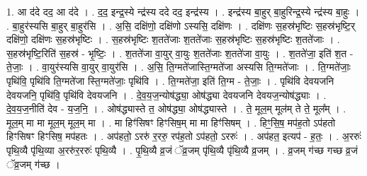 \documentclass[17pt]{extarticle}
\begin{document}
1. आ द॑दे दद॒ आ द॑दे । . द॒द॒ इन्द्र॒स्ये न्द्र॑स्य ददे दद॒ इन्द्र॑स्य । . इन्द्र॑स्य बा॒हुर् बा॒हुरिन्द्र॒स्ये न्द्र॑स्य बा॒हुः । . बा॒हुर॑स्यसि बा॒हुर् बा॒हुर॑सि । . अ॒सि॒ दक्षि॑णो॒ दक्षि॑णो ऽस्यसि॒ दक्षि॑णः । . दक्षि॑णः स॒हस्र॑भृष्टिः स॒हस्र॑भृष्टि॒र् दक्षि॑णो॒ दक्षि॑णः स॒हस्र॑भृष्टिः । . स॒हस्र॑भृष्टिः श॒तते॑जाः श॒तते॑जाः स॒हस्र॑भृष्टिः स॒हस्र॑भृष्टिः श॒तते॑जाः । . स॒हस्र॑भृष्टि॒रिति॑ स॒हस्र॑ - भृ॒ष्टिः॒ । . श॒तते॑जा वा॒युर् वा॒युः श॒तते॑जाः श॒तते॑जा वा॒युः । . श॒तते॑जा॒ इति॑ श॒त - ते॒जाः॒ । . वा॒युर॑स्यसि वा॒युर् वा॒युर॑सि । . अ॒सि॒ ति॒ग्मते॑जास्ति॒ग्मते॑जा अस्यसि ति॒ग्मते॑जाः । . ति॒ग्मते॑जाः॒ पृथि॑वि॒ पृथि॑वि ति॒ग्मते॑जा स्ति॒ग्मते॑जाः॒ पृथि॑वि । . ति॒ग्मते॑जा॒ इति॑ ति॒ग्म - ते॒जाः॒ । . पृथि॑वि देवयजनि देवयजनि॒ पृथि॑वि॒ पृथि॑वि देवयजनि । . दे॒व॒य॒ज॒न्योष॑द्ध्या॒ ओष॑द्ध्या देवयजनि देवयज॒न्योष॑द्ध्याः । . दे॒व॒य॒ज॒नीति॑ देव - य॒ज॒नि॒ । . ओष॑द्ध्यास्ते त॒ ओष॑द्ध्या॒ ओष॑द्ध्यास्ते । . ते॒ मूल॒म् मूल॑म् ते ते॒ मूल᳚म् । . मूल॒म् मा मा मूल॒म् मूल॒म् मा । . मा हिꣳ॑सिषꣳ हिꣳसिष॒म् मा मा हिꣳ॑सिषम् । . हिꣳ॒॒सि॒ष॒ मप॑ह॒तो ऽप॑हतो हिꣳसिषꣳ हिꣳसिष॒ मप॑हतः । . अप॑हतो॒ ऽररु॑ र॒ररु॒ रप॑ह॒तो ऽप॑हतो॒ ऽररुः॑ । . अप॑हत॒ इत्यप॑ - ह॒तः॒ । . अ॒ररुः॑ पृथि॒व्यै पृ॑थि॒व्या अ॒ररु॑र॒ररुः॑ पृथि॒व्यै । . पृ॒थि॒व्यै व्र॒जं ॅव्र॒जम् पृ॑थि॒व्यै पृ॑थि॒व्यै व्र॒जम् । . व्र॒जम् ग॑च्छ गच्छ व्र॒जं ॅव्र॒जम् ग॑च्छ । \newline
\end{document}
